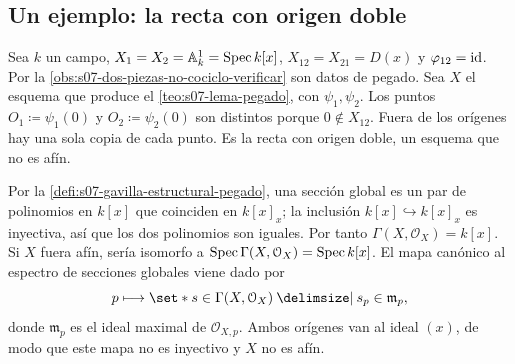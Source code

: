 \begin{samepage}
\section{Un ejemplo: la recta con origen doble}

\begin{ejem}
\label{ejem:s07-recta-origen-doble}
Sea $k$ un campo, $X_1=X_2=\mathbb A_k^1=\operatorname{Spec} k[x]$, $X_{12}=X_{21}=D(x)$ y $\varphi_{12}=\operatorname{id}$. Por la \cref{obs:s07-dos-piezas-no-cociclo-verificar} son datos de pegado. Sea $X$ el esquema que produce el \cref{teo:s07-lema-pegado}, con $\psi_1,\psi_2$. Los puntos $O_1\coloneqq \psi_1(0)$ y $O_2\coloneqq \psi_2(0)$ son distintos porque $0\notin X_{12}$. Fuera de los orígenes hay una sola copia de cada punto. Es la recta con origen doble, un esquema que no es afín.

\begin{center}
\end{center}

Por la \cref{defi:s07-gavilla-estructural-pegado}, una sección global es un par de polinomios en $k[x]$ que coinciden en $k[x]_x$; la inclusión $k[x]\hookrightarrow k[x]_x$ es inyectiva, así que los dos polinomios son iguales. Por tanto $\Gamma(X,\mathcal O_X)=k[x]$. Si $X$ fuera afín, sería isomorfo a $\operatorname{Spec}\Gamma(X,\mathcal O_X)=\operatorname{Spec} k[x]$. El mapa canónico al espectro de secciones globales viene dado por
\[
p\longmapsto\set*{s\in\Gamma(X,\mathcal O_X)\given s_p\in\mathfrak m_p},
\]
donde $\mathfrak m_p$ es el ideal maximal de $\mathcal O_{X,p}$. Ambos orígenes van al ideal $(x)$, de modo que este mapa no es inyectivo y $X$ no es afín.
\end{ejem}
\end{samepage}

